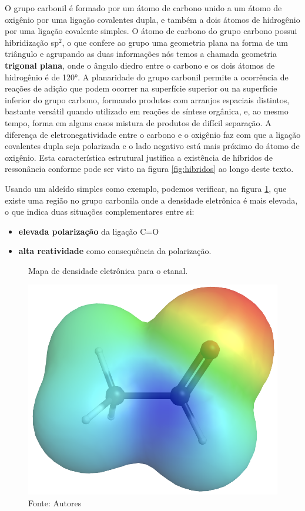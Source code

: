 O grupo carbonil é formado por um átomo de carbono unido a um átomo de oxigênio por uma ligação covalentes dupla, e também a dois átomos de hidrogênio por uma ligação covalente simples. 
O átomo de carbono do grupo carbono possui hibridização sp$^2$, o que confere ao grupo uma geometria plana na forma de um triângulo e agrupando as duas informações nós temos a chamada geometria \textbf{trigonal plana}, onde o ângulo diedro entre o carbono e os dois átomos de hidrogênio é de 120°. 
A planaridade do grupo carbonil permite a ocorrência de reações de adição que podem ocorrer na superfície superior ou na superfície inferior do grupo carbono, formando produtos com arranjos espaciais distintos, bastante versátil quando utilizado em reações de síntese orgânica, e, ao mesmo tempo, forma em alguns casos mistura de produtos de difícil separação.
A diferença de eletronegatividade entre o carbono e o oxigênio faz com que a ligação covalentes dupla seja polarizada e o lado negativo está mais próximo do átomo de oxigênio. Esta característica estrutural justifica a existência de híbridos de ressonância conforme pode ser visto na figura \ref{fig:hibridos} ao longo deste texto.

Usando um aldeído simples como exemplo, podemos verificar, na figura \ref{fig:etanal}, que existe uma região no grupo carbonila onde a densidade eletrônica é mais elevada, o que indica duas situações complementares entre si: 

\begin{itemize}
	\item \textbf{elevada polarização} da ligação C=O
	\item \textbf{alta reatividade} como consequência da polarização.
\end{itemize}

\begin{figure}[h]
	\centering
	\caption{Mapa de densidade eletrônica para o etanal.}
	\vspace{0.5cm}
	\includegraphics[width=0.5\linewidth]{imagens/etanal.png}
	\caption*{Fonte: Autores}
	\label{fig:etanal}
\end{figure}

